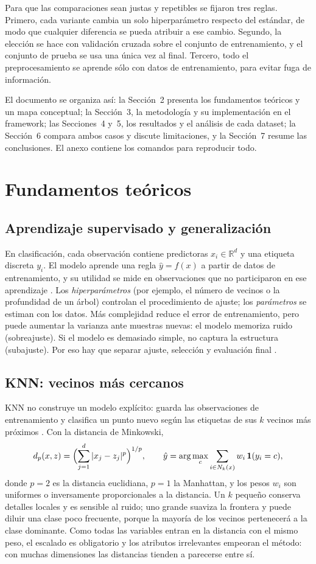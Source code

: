 \documentclass[11pt]{article}
\begin{document}
Para que las comparaciones sean justas y repetibles se fijaron tres reglas. Primero,
cada variante cambia un solo hiperparámetro respecto del estándar, de modo que
cualquier diferencia se pueda atribuir a ese cambio. Segundo, la elección se hace
con validación cruzada sobre el conjunto de entrenamiento, y el conjunto de prueba
se usa una única vez al final. Tercero, todo el preprocesamiento se aprende sólo
con datos de entrenamiento, para evitar fuga de información.

El documento se organiza así: la Sección~2 presenta los fundamentos teóricos y un
mapa conceptual; la Sección~3, la metodología y su implementación en el framework;
las Secciones~4 y~5, los resultados y el análisis de cada dataset; la Sección~6
compara ambos casos y discute limitaciones, y la Sección~7 resume las conclusiones.
El anexo contiene los comandos para reproducir todo.


\section{Fundamentos teóricos}

\subsection{Aprendizaje supervisado y generalización}
En clasificación, cada observación contiene predictoras $x_i\in\mathbb{R}^d$ y una
etiqueta discreta $y_i$. El modelo aprende una regla $\hat y=f(x)$ a partir de
datos de entrenamiento, y su utilidad se mide en observaciones que no participaron
en ese aprendizaje \cite{hastie}. Los \emph{hiperparámetros} (por ejemplo, el número
de vecinos o la profundidad de un árbol) controlan el procedimiento de ajuste; los
\emph{parámetros} se estiman con los datos. Más complejidad reduce el error de
entrenamiento, pero puede aumentar la varianza ante muestras nuevas: el modelo
memoriza ruido (sobreajuste). Si el modelo es demasiado simple, no captura la
estructura (subajuste). Por eso hay que separar ajuste, selección y evaluación final
\cite{sklearnleakage,sklearnmetrics}.

\subsection{KNN: vecinos más cercanos}
KNN no construye un modelo explícito: guarda las observaciones de entrenamiento y
clasifica un punto nuevo según las etiquetas de sus $k$ vecinos más próximos
\cite{coverhart,sklearnknn}. Con la distancia de Minkowski,
\[
 d_p(x,z)=\Bigl(\sum_{j=1}^{d}|x_j-z_j|^p\Bigr)^{1/p},
 \qquad
 \hat y=\arg\max_c\sum_{i\in N_k(x)}w_i\,\mathbf{1}(y_i=c),
\]
donde $p=2$ es la distancia euclidiana, $p=1$ la Manhattan, y los pesos $w_i$ son
uniformes o inversamente proporcionales a la distancia. Un $k$ pequeño conserva
detalles locales y es sensible al ruido; uno grande suaviza la frontera y puede
diluir una clase poco frecuente, porque la mayoría de los vecinos pertenecerá a la
clase dominante. Como todas las variables entran en la distancia con el mismo peso,
el escalado es obligatorio y los atributos irrelevantes empeoran el método: con
muchas dimensiones las distancias tienden a parecerse entre sí.
\end{document}
